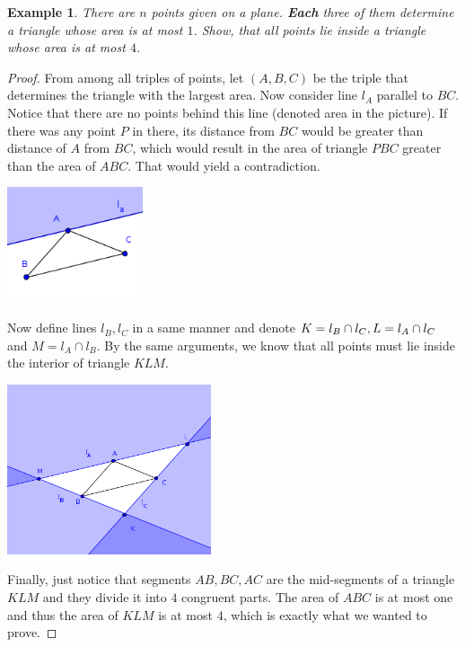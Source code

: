 \documentclass[12pt]{article}
\newtheorem{theorem}{Example}
\begin{document}
\begin{theorem}
There are $n$ points given on a plane. \textbf{Each} three of them determine a triangle whose area is at most $1$. Show, that all points lie inside a triangle whose area is at most $4$.
\end{theorem}

\begin{proof}
From among all triples of points, let $(A, B, C)$ be the triple that determines the triangle with the largest area. Now consider line $l_{A}$ parallel to $BC$. Notice that there are no points behind this line (denoted area in the picture).
If there was any point $P$ in there, its distance from $BC$ would be greater than distance of $A$ from $BC$, which would result in the area of triangle $PBC$ greater than the area of $ABC$. That would yield a contradiction.
\begin{center}
\includegraphics[width=0.3\textwidth]{img1}
\end{center}
Now define lines $l_{B}, l_{C}$ in a same manner and denote $K = l_{B} \cap l_{C},\\ L = l_{A} \cap l_{C}$ and $M = l_{A} \cap l_{B}$. By the same arguments, we know that all points must lie inside the interior of triangle $KLM$.
\begin{center}
\includegraphics[width=0.45\textwidth]{img2}
\end{center}
Finally, just notice that segments $AB, BC, AC$ are the mid-segments of a triangle $KLM$ and they divide it into $4$ congruent parts. The area of $ABC$ is at most one and thus the area of $KLM$ is at most $4$, which is exactly what we wanted to prove.
\end{proof}
\end{document}
